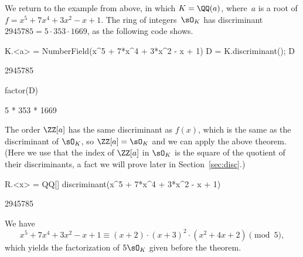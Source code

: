 We return to the example from above, in which $K = \QQ(a)$, where~$a$ is
a root of $f = x^5 + 7x^4 + 3x^2 - x + 1$.  The ring of integers~$\sO_K$
has discriminant $2945785 = 5\cdot 353\cdot 1669$, as the following
{\Sage} code shows.
\begin{sagecode}
\begin{sagecell}
K.<a> = NumberField(x^5 + 7*x^4 + 3*x^2 - x + 1)
D = K.discriminant(); D
\end{sagecell}
\begin{sageout}
2945785
\end{sageout}
\begin{sagecell}
factor(D)
\end{sagecell}
\begin{sageout}
5 * 353 * 1669
\end{sageout}
\end{sagecode}
The order $\ZZ[a]$ has the same discriminant as $f(x)$, which
is the same as the discriminant of $\sO_K$, so
$\ZZ[a] = \sO_K$ and we can apply the above theorem.
(Here we use that the index of $\ZZ[a]$ in $\sO_K$
is the square of the quotient of their discriminants,
a fact we will prove later in Section~\ref{sec:disc}.)
\begin{sagecode}
\begin{sagecell}
R.<x> = QQ[]
discriminant(x^5 + 7*x^4 + 3*x^2 - x + 1)
\end{sagecell}
\begin{sageout}
2945785
\end{sageout}
\end{sagecode}
We have
$$
  x^5+7x^4+3x^2-x+1 \equiv (x+2) \cdot (x+3)^2 \cdot (x^2+4x+2)\pmod{5},
$$
which yields the factorization of $5\sO_K$ given before the theorem.

